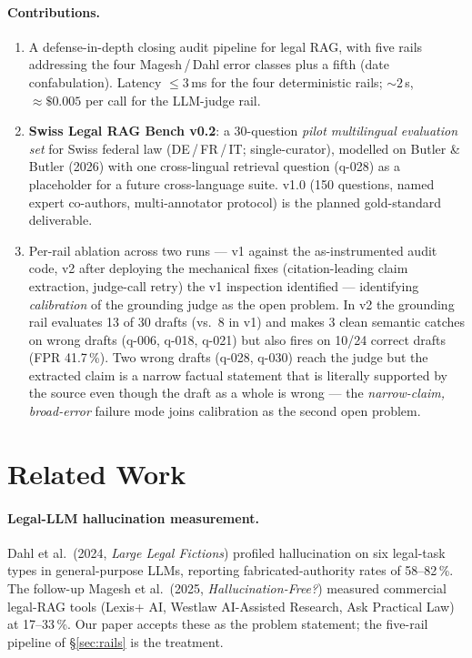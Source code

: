 \documentclass[11pt,a4paper]{article}
\begin{document}
\paragraph{Contributions.}
\begin{enumerate}
  \item A defense-in-depth closing audit pipeline for legal RAG,
        with five rails addressing the four Magesh\,/\,Dahl error
        classes plus a fifth (date confabulation).  Latency
        $\leq 3$\,ms for the four deterministic rails;
        ${\sim}2$\,s, ${\approx}\$0.005$ per call for the LLM-judge
        rail.
  \item \textbf{Swiss Legal RAG Bench v0.2}: a 30-question
        \emph{pilot multilingual evaluation set} for Swiss
        federal law (DE\,/\,FR\,/\,IT; single-curator), modelled
        on Butler \& Butler (2026) with one cross-lingual
        retrieval question (q-028) as a placeholder for a
        future cross-language suite.  v1.0 (150 questions,
        named expert co-authors, multi-annotator protocol) is
        the planned gold-standard deliverable.
  \item Per-rail ablation across two runs --- v1 against the
        as-instrumented audit code, v2 after deploying the
        mechanical fixes (citation-leading claim extraction,
        judge-call retry) the v1 inspection identified ---
        identifying \emph{calibration} of the grounding judge
        as the open problem.  In v2 the grounding rail
        evaluates 13 of 30 drafts (vs.\ 8 in v1) and makes 3
        clean semantic catches on wrong drafts (q-006, q-018,
        q-021) but also fires on 10/24 correct drafts (FPR
        41.7\,\%).  Two wrong drafts (q-028, q-030) reach the
        judge but the extracted claim is a narrow factual
        statement that is literally supported by the source
        even though the draft as a whole is wrong --- the
        \emph{narrow-claim, broad-error} failure mode joins
        calibration as the second open problem.
\end{enumerate}


\section{Related Work}
\label{sec:related}

\paragraph{Legal-LLM hallucination measurement.}
Dahl et al.\ (2024, \emph{Large Legal Fictions}) profiled
hallucination on six legal-task types in general-purpose LLMs,
reporting fabricated-authority rates of 58--82\,\%.  The follow-up
Magesh et al.\ (2025, \emph{Hallucination-Free?}) measured
commercial legal-RAG tools (Lexis+ AI, Westlaw AI-Assisted Research,
Ask Practical Law) at 17--33\,\%.  Our paper accepts these as the
problem statement; the five-rail pipeline of \S\ref{sec:rails} is
the treatment.
\end{document}
